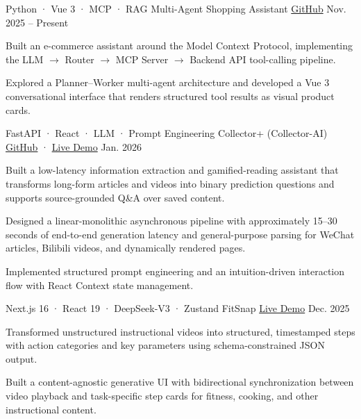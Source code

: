 
\begin{cventries}

  \cventry
    {Python · Vue 3 · MCP · RAG}
    {Multi-Agent Shopping Assistant}
    {\href{https://github.com/YifeiWang0618/Multi-Agent}{GitHub}}
    {Nov. 2025 -- Present}
    {
      \begin{cvitems}
        \item {Built an e-commerce assistant around the Model Context Protocol, implementing the LLM $\rightarrow$ Router $\rightarrow$ MCP Server $\rightarrow$ Backend API tool-calling pipeline.}
        \item {Explored a Planner--Worker multi-agent architecture and developed a Vue 3 conversational interface that renders structured tool results as visual product cards.}
      \end{cvitems}
    }

\vspace{0.8cm} %
  \cventry
    {FastAPI · React · LLM · Prompt Engineering}
    {Collector+ (Collector-AI)}
    {\href{https://github.com/YifeiWang0618/Creator_ai}{GitHub} · \href{https://collectorai.top/}{Live Demo}}
    {Jan. 2026}
    {
      \begin{cvitems}
        \item {Built a low-latency information extraction and gamified-reading assistant that transforms long-form articles and videos into binary prediction questions and supports source-grounded Q\&A over saved content.}
        \item {Designed a linear-monolithic asynchronous pipeline with approximately 15--30 seconds of end-to-end generation latency and general-purpose parsing for WeChat articles, Bilibili videos, and dynamically rendered pages.}
        \item {Implemented structured prompt engineering and an intuition-driven interaction flow with React Context state management.}
      \end{cvitems}
    }
    
\vspace{0.8cm} %
  \cventry
    {Next.js 16 · React 19 · DeepSeek-V3 · Zustand}
    {FitSnap}
    {\href{https://fit-snap-beige.vercel.app/}{Live Demo}}
    {Dec. 2025}
    {
      \begin{cvitems}
        \item {Transformed unstructured instructional videos into structured, timestamped steps with action categories and key parameters using schema-constrained JSON output.}
        \item {Built a content-agnostic generative UI with bidirectional synchronization between video playback and task-specific step cards for fitness, cooking, and other instructional content.}
      \end{cvitems}
    }
    

\end{cventries}
